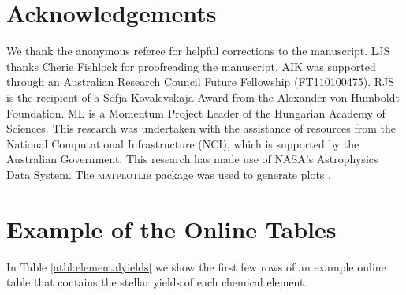 \section*{Acknowledgements}
We thank the anonymous referee for helpful corrections to the manuscript. LJS thanks Cherie Fishlock for proofreading the manuscript. AIK was supported through an Australian Research Council Future Fellowship (FT110100475). RJS is the recipient of a Sofja Kovalevskaja Award from the Alexander von Humboldt Foundation. ML is a Momentum Project Leader of the Hungarian Academy of Sciences. This research was undertaken with the assistance of resources from the National Computational Infrastructure (NCI), which is supported by the Australian Government. This research has made use of NASA's Astrophysics Data System. The \textsc{matplotlib} package was used to generate plots \citep{Hunter:2007ih}.

\section{Example of the Online Tables}
In Table \ref{atbl:elementalyields} we show the first few rows of an example online table that contains the stellar yields of each chemical element.

